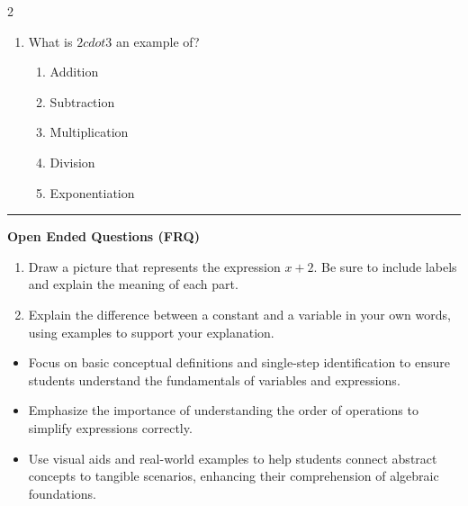 \documentclass[10pt]{article}
\begin{document}
\begin{multicols}{2}
\begin{enumerate}[label=\textbf{Q\arabic*.}, leftmargin=*, itemsep=6pt, parsep=0pt]
  \item \small What is $2 cdot 3$ an example of?
  \begin{enumerate}[label=(\Alph*), leftmargin=0.6cm, nosep, itemsep=2pt]
    \item Addition
    \item Subtraction
    \item Multiplication
    \item Division
    \item Exponentiation
  \end{enumerate}

\end{enumerate}
\end{multicols}

\vspace{-0.2cm}
\hrule
\vspace{0.2cm}
\textbf{\small Open Ended Questions (FRQ)}
\begin{enumerate}[label=\textbf{Q\arabic*.}, start=9, itemsep=5pt, topsep=0pt]

  \item \small Draw a picture that represents the expression $x + 2$. Be sure to include labels and explain the meaning of each part. \vspace{2cm}

  \item \small Explain the difference between a constant and a variable in your own words, using examples to support your explanation. \vspace{2cm}

\end{enumerate}

\vfill

\begin{tcolorbox}[colback=blue!5, colframe=mainblue!50, title=\small \textbf{Chef's Tips}, fonttitle=\bfseries, bottom=1mm]
\begin{itemize}[noitemsep, topsep=2pt, leftmargin=0.5cm]
  \item \scriptsize Focus on basic conceptual definitions and single-step identification to ensure students understand the fundamentals of variables and expressions.\item \scriptsize Emphasize the importance of understanding the order of operations to simplify expressions correctly.\item \scriptsize Use visual aids and real-world examples to help students connect abstract concepts to tangible scenarios, enhancing their comprehension of algebraic foundations.
\end{itemize}
\end{tcolorbox}
\end{document}

